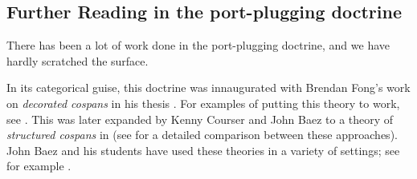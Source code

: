 \documentclass[DynamicalBook]{subfiles}
\begin{document}
\subsection{Further Reading in the port-plugging doctrine}

There has been a lot of work done in the port-plugging doctrine, and we have hardly scratched the surface.

In its categorical guise, this doctrine was innaugurated with Brendan Fong's work on \emph{decorated cospans} in his thesis \cite{Fong:Thesis}. For examples of putting this theory to work, see \cite{baez2018compositional, baez2016compositional, baez2017compositional}. This was later expanded by Kenny Courser and John Baez to a theory of \emph{structured cospans} in \cite{Baez.Courser:Structured.Cospans} (see \cite{Baez.Courser.Vasilakopolou:Structured.vs.Decorated} for a detailed comparison between these approaches). John Baez and his students have used these theories in a variety of settings; see for example \cite{Baez.Master:Open.Petri.Nets, Baez.Courser:Open.Markov.Processes}.
\end{document}
